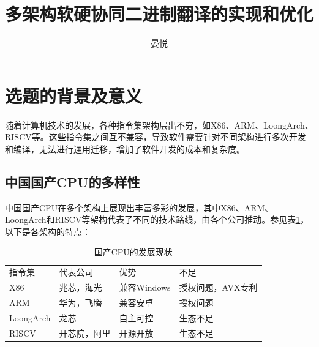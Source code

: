 \documentclass{Style/ucasproposal}%
\title{多架构软硬协同二进制翻译的实现和优化}%
\author{晏悦}%
\institute{中国科学院计算技术研究所}%
\begin{document}

\maketitle%
\tableofcontents%
\clearpage
{}%
\section{选题的背景及意义}

随着计算机技术的发展，各种指令集架构层出不穷，如X86、ARM、LoongArch\cite{LoongArch2023}、RISCV等。这些指令集之间互不兼容，导致软件需要针对不同架构进行多次开发和编译，无法进行通用迁移，增加了软件开发的成本和复杂度。

\subsection{中国国产CPU的多样性}

中国国产CPU在多个架构上展现出丰富多彩的发展，其中X86、ARM、LoongArch和RISCV等架构代表了不同的技术路线，由各个公司推动。参见表\ref{tab:CPUs}，以下是各架构的特点：

\begin{table}[]
\centering
\caption{国产CPU的发展现状}
\label{tab:CPUs}
    \begin{tabular}{llll}
    \rowcolor[HTML]{FBE5D6} 
    指令集       & 代表公司   & 优势        & 不足         \\
    X86       & 兆芯，海光  & 兼容Windows & 授权问题，AVX专利 \\
    ARM       & 华为，飞腾  & 兼容安卓      & 授权问题       \\
    LoongArch & 龙芯     & 自主可控      & 生态不足       \\
    RISCV     & 开芯院，阿里 & 开源开放      & 生态不足      
    \end{tabular}
    \end{table}
\end{document}
